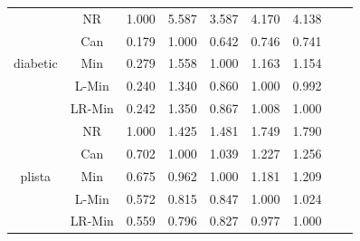 \documentclass[11pt]{book}
\begin{document}
\begin{table}
\begin{tabular}{|c|c|c|c|c|c|c|c|c|}
    \hline
    \multirow{5}{*}{diabetic}
         & NR & 1.000 & 5.587 & 3.587 & 4.170 & 4.138 \\                                                                                                                                                             
         & Can & 0.179 & 1.000 & 0.642 & 0.746 & 0.741 \\                                                                                                                                                            
         & Min & 0.279 & 1.558 & 1.000 & 1.163 & 1.154 \\                                                                                                                                                            
         & L-Min & 0.240 & 1.340 & 0.860 & 1.000 & 0.992 \\                                                                                                                                                          
         & LR-Min & 0.242 & 1.350 & 0.867 & 1.008 & 1.000 \\  
    
    \hline
    \multirow{5}{*}{plista}
         & NR & 1.000 & 1.425 & 1.481 & 1.749 & 1.790 \\                                                                                                                                                             
         & Can & 0.702 & 1.000 & 1.039 & 1.227 & 1.256 \\                                                                                                                                                            
         & Min & 0.675 & 0.962 & 1.000 & 1.181 & 1.209 \\                                                                                                                                                            
         & L-Min & 0.572 & 0.815 & 0.847 & 1.000 & 1.024 \\                                                                                                                                                          
         & LR-Min & 0.559 & 0.796 & 0.827 & 0.977 & 1.000 \\
  

\end{tabular}
\end{table}
\end{document}

